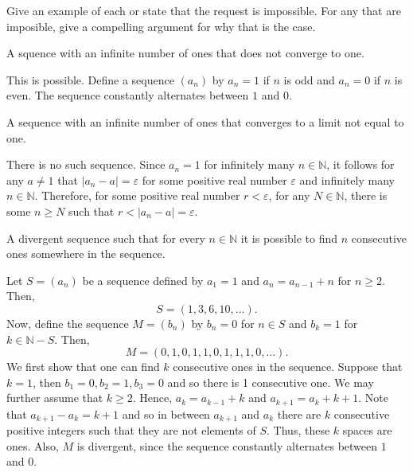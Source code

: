 \documentclass[12pt]{article}
\newcommand{\N}{\mathbb{N}}
\newenvironment{problem}[2][Problem]{\begin{trivlist} \item[\hskip \labelsep {\bfseries #1}\hskip \labelsep {\bfseries #2.}]}{\end{trivlist}}
\newenvironment{solution}[1][Solution]{\begin{trivlist} \item[\hskip \labelsep {\bfseries #1}]}{\end{trivlist}}
\begin{document}
    \begin{problem}{2.2.4}
      Give an example of each or state that the request is impossible. For any that are imposible, give a compelling argument for why that is the case.
      \begin{enumerate}[label=(\alph*)]
	\item A squence with an infinite number of ones that does not converge to one.
    \begin{solution}
      This is possible. Define a sequence $(a_{n})$ by $a_{n}=1$ if $n$ is odd and $a_{n} =0$ if $n$ is even. The sequence constantly alternates between $1$ and $0$.
    \end{solution}
  \item A sequence with an infinite number of ones that converges to a limit not equal to one.
    \begin{solution}
      There is no such sequence. Since $a_{n}=1$ for infinitely many $n\in \N$, it follows for any $a\neq 1$ that $|a_{n}-a|=\varepsilon$ for some positive real number $\varepsilon$ and infinitely many $n\in \N$. Therefore, for some positive real number $r<\varepsilon$, for any $N\in \N$, there is some $n\geq N$ such that $r<|a_{n}-a|=\varepsilon$.    
    \end{solution}
  \item A divergent sequence such that for every $n\in \N$ it is possible to find $n$ consecutive ones somewhere in the sequence.
    \begin{solution}
      Let $S=(a_{n})$ be a sequence defined by $a_{1}=1$ and $a_{n}=a_{n-1}+n$ for $n\geq 2$. Then,
    \begin{equation*}
      S=(1,3,6,10,\dots).
    \end{equation*}
    Now, define the sequence $M=(b_{n})$ by $b_{n} = 0$ for $n\in S$ and $b_{k}=1$ for $k\in \N-S$. Then, 
    \begin{equation*}
      M=(0,1,0,1,1,0,1,1,1,0,\dots).
    \end{equation*}
        We first show that one can find $k$ consecutive ones in the sequence. Suppose that $k=1$, then $b_{1}=0, b_{2}=1,b_{3}=0$  and so there is 1 consecutive one. We may further assume that $k\geq 2$. Hence, $a_{k}=a_{k-1}+k$ and $a_{k+1}=a_{k}+k+1$. Note that $a_{k+1}-a_{k} = k+1$ and so in between $a_{k+1}$ and $a_{k}$ there are $k$ consecutive positive integers such that they are not elements of $S$. Thus, these $k$ spaces are ones. Also, $M$ is divergent, since the sequence constantly alternates between $1$ and $0$.
    \end{solution}
    \end{enumerate}
    \end{problem}
\end{document}
